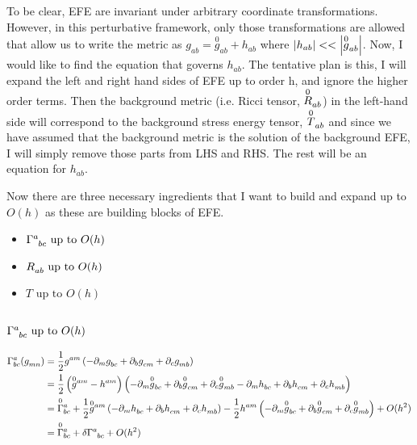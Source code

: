 To be clear, EFE are invariant under arbitrary coordinate transformations. However, in this perturbative framework, only those transformations are allowed that allow us to write the metric as $g_{ab}= \overset{0}{g}_{ab}+ h_{ab}$ where $\abs{h_{ab}}<<\abs{\overset{0}{g}_{ab}}$. Now, I would like to find the equation that governs $h_{ab}$. The tentative plan is this, I will expand the left and right hand sides of EFE up to order h, and ignore the higher order terms. Then the background metric (i.e. Ricci tensor, $\tt{\overset{0}{R}}{}{ab}$) in the left-hand side will correspond to the background stress energy tensor, $\tt{\overset{0}{T}}{}{ab}$ and since we have assumed that the background metric is the solution of the background EFE, I will simply remove those parts from LHS and RHS. The rest will be an equation for $h_{ab}$.

Now there are three necessary ingredients that I want to build and expand up to $O(h)$ as these are building blocks of EFE.
\begin{itemize}
    \item $\tt{\Gamma}{a}{bc} \text{ up to } O(h)$
    \item $\tt{R}{}{ab}\text{ up to } O(h)$
    \item $T\text{ up to } O(h)$
\end{itemize}

\subsubsection{$\tt{\Gamma}{a}{bc} \text{ up to } O(h)$}
\begin{align*}
    \ttw{\Gamma}{a}{bc}(\tt{g}{}{mn}) &= \frac{1}{2} \tt{g}{am}{} \lera{-\partial_m\tt{g}{}{bc}+ \partial_b\tt{g}{}{cm}+\partial_c\tt{g}{}{mb}}\\
    &= \frac{1}{2} \lera{\tt{\overset{0}{g}{}}{am}{}-\tt{h}{am}{}}\lera{-\partial_m\tt{\overset{0}{g}}{}{bc}+ \partial_b\tt{\overset{0}{g}}{}{cm}+\partial_c\tt{\overset{0}{g}}{}{mb}-\partial_m\tt{h}{}{bc}+ \partial_b\tt{h}{}{cm}+\partial_c\tt{h}{}{mb}}\\
    &= \ttw{\overset{0}{\Gamma}{}}{a}{bc}+\frac{1}{2} \tt{\overset{0}{g}{}}{am}{}\lera{-\partial_m\tt{h}{}{bc}+ \partial_b\tt{h}{}{cm}+\partial_c\tt{h}{}{mb}}-\frac{1}{2}\tt{h}{am}{} \lera{-\partial_m\tt{\overset{0}{g}}{}{bc}+ \partial_b\tt{\overset{0}{g}}{}{cm}+\partial_c\tt{\overset{0}{g}{}}{}{mb}}+O(h^2)\\
    &= \ttw{\overset{0}{\Gamma}{}}{a}{bc} + \delta\tt{\Gamma}{a}{bc}+ O(h^2)\\
\end{align*}

